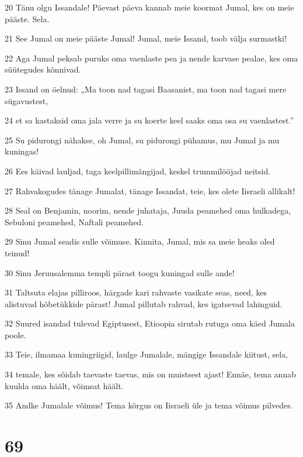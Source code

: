 \par 20 Tänu olgu Issandale! Päevast päeva kannab meie koormat Jumal, kes on meie pääste. Sela.
\par 21 See Jumal on meie pääste Jumal! Jumal, meie Issand, toob välja surmastki!
\par 22 Aga Jumal peksab puruks oma vaenlaste pea ja nende karvase pealae, kes oma süütegudes kõnnivad.
\par 23 Issand on öelnud: „Ma toon nad tagasi Baasanist, ma toon nad tagasi mere sügavustest,
\par 24 et sa kastaksid oma jala verre ja su koerte keel saaks oma osa su vaenlastest.”
\par 25 Su pidurongi nähakse, oh Jumal, su pidurongi pühamus, mu Jumal ja mu kuningas!
\par 26 Ees käivad lauljad, taga keelpillimängijad, keskel trummilööjad neitsid.
\par 27 Rahvakogudes tänage Jumalat, tänage Issandat, teie, kes olete Iisraeli allikalt!
\par 28 Seal on Benjamin, noorim, nende juhataja, Juuda peamehed oma hulkadega, Sebuloni peamehed, Naftali peamehed.
\par 29 Sinu Jumal seadis sulle võimuse. Kinnita, Jumal, mis sa meie heaks oled teinud!
\par 30 Sinu Jeruusalemma templi pärast toogu kuningad sulle ande!
\par 31 Taltsuta elajas pilliroos, härgade kari rahvaste vasikate seas, need, kes alistuvad hõbetükkide pärast! Jumal pillutab rahvad, kes igatsevad lahinguid.
\par 32 Suured isandad tulevad Egiptusest, Etioopia sirutab rutuga oma käed Jumala poole.
\par 33 Teie, ilmamaa kuningriigid, laulge Jumalale, mängige Issandale kiitust, sela,
\par 34 temale, kes sõidab taevaste taevas, mis on muistsest ajast! Ennäe, tema annab kuulda oma häält, võimsat häält.
\par 35 Andke Jumalale võimus! Tema kõrgus on Iisraeli üle ja tema võimus pilvedes.

\chapter{69}

